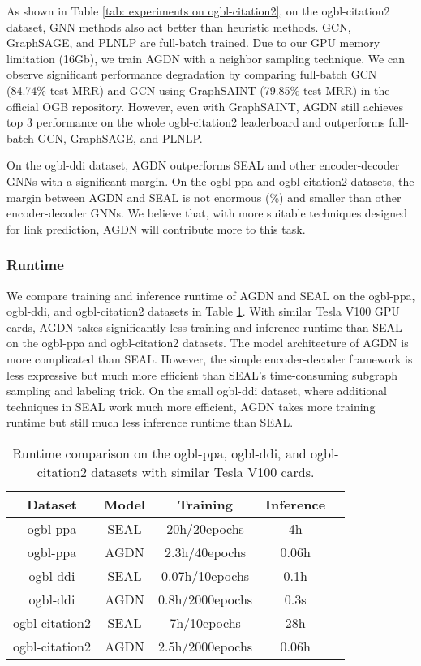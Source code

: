 \documentclass{article}
\begin{document}
As shown in Table \ref{tab: experiments on ogbl-citation2}, on the ogbl-citation2 dataset, GNN methods also act better than heuristic methods. GCN, GraphSAGE, and PLNLP are full-batch trained. Due to our GPU memory limitation (16Gb), we train AGDN with a neighbor sampling technique. We can observe significant performance degradation by comparing full-batch GCN (84.74\% test MRR) and GCN using GraphSAINT (79.85\% test MRR) in the official OGB repository. However, even with GraphSAINT, AGDN still achieves top 3 performance on the whole ogbl-citation2 leaderboard and outperforms full-batch GCN, GraphSAGE, and PLNLP. 

On the ogbl-ddi dataset, AGDN outperforms SEAL and other encoder-decoder GNNs with a significant margin. On the ogbl-ppa and ogbl-citation2 datasets, the margin between AGDN and SEAL is not enormous (\%) and smaller than other encoder-decoder GNNs. We believe that, with more suitable techniques designed for link prediction, AGDN will contribute more to this task.

\subsubsection{Runtime}
We compare training and inference runtime of AGDN and SEAL on the ogbl-ppa, ogbl-ddi, and ogbl-citation2 datasets in Table \ref{tab:runtime on ogbl}. With similar Tesla V100 GPU cards, AGDN takes significantly less training and inference runtime than SEAL on the ogbl-ppa and ogbl-citation2 datasets. The model architecture of AGDN is more complicated than SEAL. However, the simple encoder-decoder framework is less expressive but much more efficient than SEAL's time-consuming subgraph sampling and labeling trick. On the small ogbl-ddi dataset, where additional techniques in SEAL work much more efficient, AGDN takes more training runtime but still much less inference runtime than SEAL.

\begin{table}[!hbt]
\caption{Runtime comparison on the ogbl-ppa, ogbl-ddi, and ogbl-citation2 datasets with similar Tesla V100 cards.}
\label{tab:runtime on ogbl}
\small
\begin{center}
    \begin{tabular}{cc|ccc}
    \toprule
     \textbf{Dataset} & \textbf{Model}  & \textbf{Training} & \textbf{Inference}  \\
       \midrule
      ogbl-ppa & SEAL & 20h/20epochs & 4h \\
      ogbl-ppa & AGDN & 2.3h/40epochs & 0.06h \\
      ogbl-ddi & SEAL & 0.07h/10epochs & 0.1h \\
      ogbl-ddi & AGDN & 0.8h/2000epochs & 0.3s \\
      ogbl-citation2 & SEAL & 7h/10epochs & 28h \\
      ogbl-citation2 & AGDN & 2.5h/2000epochs & 0.06h \\
    \bottomrule
    \end{tabular}

\end{center}
\end{table}
\end{document}
